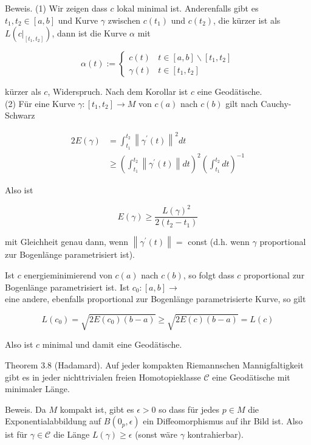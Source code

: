 \documentclass[10pt, letterpaper]{article}
\begin{document}
Beweis. (1) Wir zeigen dass $c$ lokal minimal ist. Anderenfalls gibt es $t_{1}, t_{2} \in[a, b]$ und Kurve $\gamma$ zwischen $c\left(t_{1}\right)$ und $c\left(t_{2}\right)$, die kürzer ist als $L\left(\left.c\right|_{\left[t_{1}, t_{2}\right]}\right)$, dann ist die Kurve $\alpha$ mit

$$
\alpha(t):=\left\{\begin{array}{cc}
c(t) & t \in[a, b] \backslash\left[t_{1}, t_{2}\right] \\
\gamma(t) & t \in\left[t_{1}, t_{2}\right]
\end{array}\right.
$$

kürzer als $c$, Widerspruch. Nach dem Korollar ist $c$ eine Geodätische.\\
(2) Für eine Kurve $\gamma:\left[t_{1}, t_{2}\right] \rightarrow M$ von $c(a)$ nach $c(b)$ gilt nach Cauchy-Schwarz

$$
\begin{aligned}
2 E(\gamma) & =\int_{t_{1}}^{t_{2}}\left\|\gamma^{\prime}(t)\right\|^{2} d t \\
& \geq\left(\int_{t_{1}}^{t_{2}}\left\|\gamma^{\prime}(t)\right\| d t\right)^{2}\left(\int_{t_{1}}^{t_{2}} d t\right)^{-1}
\end{aligned}
$$

Also ist

$$
E(\gamma) \geq \frac{L(\gamma)^{2}}{2\left(t_{2}-t_{1}\right)}
$$

mit Gleichheit genau dann, wenn $\left\|\gamma^{\prime}(t)\right\|=$ const (d.h. wenn $\gamma$ proportional zur Bogenlänge parametrisiert ist).

Ist $c$ energieminimierend von $c(a)$ nach $c(b)$, so folgt dass $c$ proportional zur Bogenlänge parametrisiert ist. Ist $c_{0}:[a, b] \rightarrow$\\
eine andere, ebenfalls proportional zur Bogenlänge parametrisierte Kurve, so gilt

$$
L\left(c_{0}\right)=\sqrt{2 E\left(c_{0}\right)(b-a)} \geq \sqrt{2 E(c)(b-a)}=L(c)
$$

Also ist $c$ minimal und damit eine Geodätische.

Theorem 3.8 (Hadamard). Auf jeder kompakten Riemannschen Mannigfaltigkeit gibt es in jeder nichttrivialen freien Homotopieklasse $\mathcal{C}$ eine Geodätische mit minimaler Länge.

Beweis. Da $M$ kompakt ist, gibt es $\epsilon>0$ so dass für jedes $p \in M$ die Exponentialabbildung auf $B\left(0_{p}, \epsilon\right)$ ein Diffeomorphismus auf ihr Bild ist. Also ist für $\gamma \in \mathcal{C}$ die Länge $L(\gamma) \geq \epsilon$ (sonst wäre $\gamma$ kontrahierbar).
\end{document}
